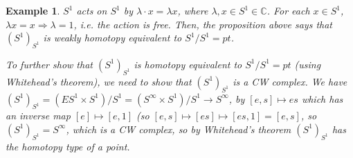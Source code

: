 \documentclass{article}
\theoremstyle{mystyle}
\newtheorem*{example}{Example}
\theoremstyle{remark}
\numberwithin{equation}{section}
\begin{document}
\begin{example}$S^1$ acts on $S^1$ by $\lambda\cdot x = \lambda x$, where $\lambda, x\in S^1 \in \mathbb{C}$. For each $x\in S^1$, $\lambda x = x\Rightarrow \lambda=1$, i.e. the action is free. Then, the proposition above says that $(S^1)_{S^1}$ is weakly homotopy equivalent to $S^1/S^1 = pt$. 

To further show that $(S^1)_{S^1}$ is homotopy equivalent to $S^1/S^1 = pt$ (using Whitehead's theorem), we need to show that $(S^1)_{S^1}$ is a CW complex. We have $(S^1)_{S^1} = (ES^1\times S^1)/S^1 = (S^\infty\times S^1)/S^1\rightarrow S^\infty$, by $[e,s]\mapsto es$ which has an inverse map $[e]\mapsto [e,1]$ (so $[e,s]\mapsto [es] \mapsto [es,1] = [e,s]$, so $(S^1)_{S^1}=S^\infty$, which is a CW complex, so by Whitehead's theorem $(S^1)_{S^1}$ has the homotopy type of a point.
\end{example}
\end{document}
